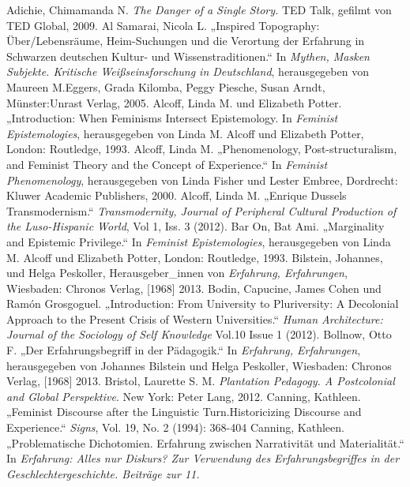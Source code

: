 \begin{thebibliography}{100} %
  Adichie, Chimamanda N. \emph{The Danger of a Single Story.} TED Talk, gefilmt von TED Global, 2009. 
 Al Samarai, Nicola L. „Inspired Topography: Über/Lebensräume, Heim-Suchungen und die
Verortung der Erfahrung in Schwarzen deutschen Kultur- und Wissenstraditionen.“
In \emph{Mythen, Masken Subjekte. Kritische Weißseinsforschung in Deutschland}, herausgegeben von Maureen M.Eggers, Grada Kilomba, Peggy Piesche, Susan Arndt, Münster:Unrast Verlag, 2005.
 Alcoff, Linda M. und Elizabeth Potter. „Introduction: When Feminisms Intersect Epistemology. In
\emph{Feminist Epistemologies}, herausgegeben von Linda M. Alcoff und Elizabeth Potter, London: Routledge, 1993.
 Alcoff, Linda M. „Phenomenology, Post-structuralism, and
Feminist Theory and the Concept of
Experience.“ In \emph{Feminist Phenomenology}, herausgegeben von Linda Fisher und Lester Embree, Dordrecht: Kluwer Academic Publishers, 2000.
 Alcoff, Linda M. „Enrique Dussels Transmodernism.“ \emph{Transmodernity, Journal of Peripheral
Cultural Production of the Luso-Hispanic World}, Vol 1, Iss. 3 (2012).
 Bar On, Bat Ami. „Marginality and Epistemic Privilege.“ In
\emph{Feminist Epistemologies},
herausgegeben von Linda M. Alcoff und Elizabeth Potter, London: Routledge, 1993.
 Bilstein, Johannes, und  Helga Peskoller, Herausgeber\_innen von
\emph{Erfahrung, Erfahrungen}, Wiesbaden: Chronos Verlag, [1968] 2013.
 Bodin, Capucine, James Cohen und Ramón Grosgoguel. „Introduction: From University to
Pluriversity: A Decolonial Approach to the Present Crisis of Western
Universities.“ \emph{Human Architecture: Journal of the Sociology of Self
Knowledge} Vol.10 Issue 1 (2012).
 Bollnow, Otto F. „Der Erfahrungsbegriff in der Pädagogik.“ In
\emph{Erfahrung, Erfahrungen},
herausgegeben von Johannes Bilstein und Helga Peskoller, Wiesbaden: Chronos Verlag, [1968] 2013.
 Bristol, Laurette S. M. \emph{Plantation Pedagogy. A
Postcolonial and Global Perspektive}. New York:
Peter Lang, 2012.
 Canning, Kathleen. „Feminist Discourse after the Linguistic Turn.Historicizing Discourse and
Experience.“ \emph{Signs}, Vol. 19, No. 2 (1994): 368-404
 Canning, Kathleen. „Problematische Dichotomien. Erfahrung zwischen Narrativität und
Materialität.“ In \emph{Erfahrung: Alles nur Diskurs? Zur Verwendung des
  Erfahrungsbegriffes in der Geschlechtergeschichte. Beiträge zur 11.
}
\end{thebibliography}
